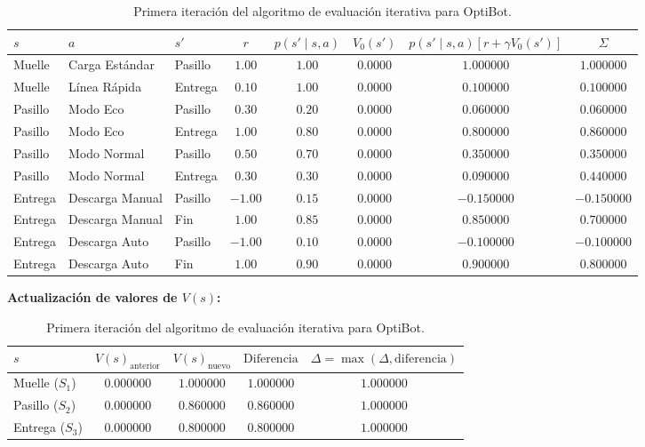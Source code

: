 \begin{table}[!htb]
\centering
\small
\setlength{\tabcolsep}{3.5pt}
\begin{tabular}{lllccccc}
\toprule
$s$ & $a$ & $s'$ & $r$ & $p(s' \mid s, a)$ & $V_0(s')$ & $p(s' \mid s, a)[r + \gamma V_0(s')]$ & $\Sigma$ \\
\midrule
Muelle & Carga Estándar & Pasillo & $1.00$ & $1.00$ & $0.0000$ & $1.000000$ & $\mathbf{1.000000}$ \\
Muelle & Línea Rápida   & Entrega & $0.10$ & $1.00$ & $0.0000$ & $0.100000$ & $0.100000$ \\
\midrule
Pasillo & Modo Eco    & Pasillo & $0.30$ & $0.20$ & $0.0000$ & $0.060000$ & $0.060000$ \\
Pasillo & Modo Eco    & Entrega & $1.00$ & $0.80$ & $0.0000$ & $0.800000$ & $\mathbf{0.860000}$ \\
Pasillo & Modo Normal & Pasillo & $0.50$ & $0.70$ & $0.0000$ & $0.350000$ & $0.350000$ \\
Pasillo & Modo Normal & Entrega & $0.30$ & $0.30$ & $0.0000$ & $0.090000$ & $0.440000$ \\
\midrule
Entrega & Descarga Manual & Pasillo & $-1.00$ & $0.15$ & $0.0000$ & $-0.150000$ & $-0.150000$ \\
Entrega & Descarga Manual & Fin     & $1.00$  & $0.85$ & $0.0000$ & $0.850000$  & $0.700000$ \\
Entrega & Descarga Auto   & Pasillo & $-1.00$ & $0.10$ & $0.0000$ & $-0.100000$ & $-0.100000$ \\
Entrega & Descarga Auto   & Fin     & $1.00$  & $0.90$ & $0.0000$ & $0.900000$  & $\mathbf{0.800000}$ \\
\bottomrule
\end{tabular}
\vspace{6pt}

\textbf{Actualización de valores de $V(s)$:}

\begin{tabular}{lcccc}
\toprule
$s$ & $V(s)_{\text{anterior}}$ & $V(s)_{\text{nuevo}}$ & $\text{Diferencia}$ & $\Delta = \max(\Delta, \text{diferencia})$ \\
\midrule
Muelle ($S_1$)  & $0.000000$ & $1.000000$ & $1.000000$ & $1.000000$ \\
Pasillo ($S_2$) & $0.000000$ & $0.860000$ & $0.860000$ & $1.000000$ \\
Entrega ($S_3$) & $0.000000$ & $0.800000$ & $0.800000$ & $1.000000$ \\
\bottomrule
\end{tabular}
\caption{Primera iteración del algoritmo de evaluación iterativa para OptiBot.}
\label{tab:iteracion_1}
\end{table}

